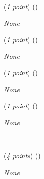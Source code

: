 \documentclass{template}
\begin{document}
\begin{problem}
~\newline
~\newline


\begin{subproblem}
(\textit{1 point}) (\scorecodeemoji{})


\end{subproblem}

\begin{solution}
\textit{None}
\end{solution}

\begin{subproblem}
(\textit{1 point}) (\scorecodeemoji{})


\end{subproblem}

\begin{solution}
\textit{None}
\end{solution}

\begin{subproblem}
(\textit{1 point}) (\scorecodeemoji{})


\end{subproblem}

\begin{solution}
\textit{None}
\end{solution}

\begin{subproblem}
(\textit{1 point}) (\scorecodeemoji{})


\end{subproblem}

\begin{solution}
\textit{None}
\end{solution}
\end{problem}

\newpage

\begin{problem}
~\newline
~\newline


\begin{subproblem}
(\textit{4 points}) (\scorecodeemoji{})


\end{subproblem}

\begin{solution}
\textit{None}
\end{solution}
\end{problem}

\newpage
\end{document}

